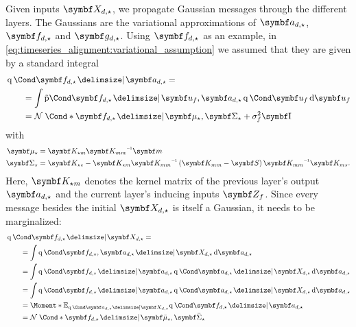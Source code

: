 Given inputs $\mat{X_{d, \star}}$, we propagate Gaussian messages through the different layers. The Gaussians are the variational approximations of $\rv{a_{d, \star}}$, $\rv{f_{d, \star}}$ and $\rv{g_{d, \star}}$.
Using $\rv{f_{d, \star}}$ as an example, in \cref{eq:timeseries_alignment:variational_assumption} we assumed that they are given by a standard integral
\begin{align}
\begin{split}
    \MoveEqLeft\Variat{\rv{f_{d, \star}} \given \rv{a_{d, \star}}} = \\
    &= \int \aProb{\rv{f_{d, \star}} \given \rv{u_f}, \rv{a_{d, \star}}}\Variat{\rv{u_f}} \diff \rv{u_f} \\
    &= \Gaussian*{\rv{f_{d, \star}} \given \mat{\mu_{\star}}, \mat{\Sigma_{\star}} + \sigma_f^2 \Eye}
\end{split}
\end{align}
with
\begin{align*}
    \mat{\mu_{\star}} &= \mat{K_{\star m}}\mat{K_{mm}}\inv \mat{m} \\
    \mat{\Sigma_{\star}} &= \mat{K_{\star\star}} - \mat{K_{\star m}}\mat{K_{mm}}\inv \left(  \mat{K_{mm}} - \mat{S} \right) \mat{K_{mm}}\inv\mat{K_{m\star}}.
\end{align*}
Here, $\mat{K_{\star m}}$ denotes the kernel matrix of the previous layer's output $\rv{a_{d, \star}}$ and the current layer's inducing inputs $\mat{Z_f}$.
Since every message besides the initial $\rv{X_{d, \star}}$ is itself a Gaussian, it needs to be marginalized:
\begin{align}
\begin{split}
    \MoveEqLeft\Variat{\rv{f_{d, \star}} \given \rv{X_{d, \star}}} = \\
    &= \int \Variat{\rv{f_{d, \star}}, \rv{a_{d, \star}} \given \rv{X_{d, \star}}} \diff \rv{a_{d, \star}} \\
    &= \int \Variat{\rv{f_{d, \star}} \given \rv{a_{d, \star}}} \Variat{\rv{a_{d, \star}} \given \rv{X_{d, \star}}} \diff \rv{a_{d, \star}} \\
    &= \int \Variat{\rv{f_{d, \star}} \given \rv{a_{d, \star}}} \Variat{\rv{a_{d, \star}} \given \rv{X_{d, \star}}} \diff \rv{a_{d, \star}} \\
    &= \Moment*{\E_{\Variat{\rv{a_{d, \star}} \given \rv{X_{d, \star}}}}}{\Variat{\rv{f_{d, \star}} \given \rv{a_{d, \star}}}} \\
    &= \Gaussian*{\rv{f_{d, \star}} \given \mat{\bar{\mu}_{\star}}, \mat{\bar{\Sigma}_{\star}}}
\end{split}
\end{align}
